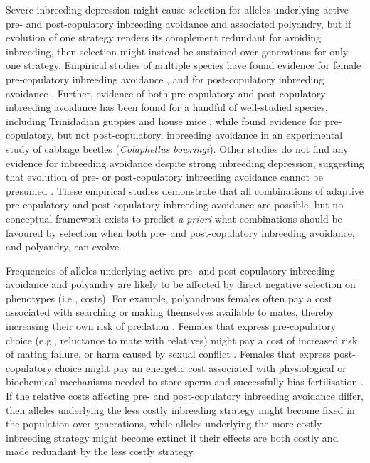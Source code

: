 \documentclass[10pt,letterpaper]{article}
\begin{document}
Severe inbreeding depression might cause selection for alleles underlying active pre- and post-copulatory inbreeding avoidance and associated polyandry, but if evolution of one strategy renders its complement redundant for avoiding inbreeding, then selection might instead be sustained over generations for only one strategy. Empirical studies of multiple species have found evidence for female pre-copulatory inbreeding avoidance \cite[e.g.,][]{Lihoreau2007, Kuriwada2011, Kingma2013, Fischer2015}, and for post-copulatory inbreeding avoidance \cite[e.g.,][]{Simmons2006, Bretman2009}. Further, evidence of both pre-copulatory and post-copulatory inbreeding avoidance has been found for a handful of well-studied species, including Trinidadian guppies \cite[\textit{Poecilia reticulata};][]{Gasparini2011, Daniel2015} and house mice \cite[\textit{Mus domesticus};][]{Potts1991, Firman2015}, while \cite{Liu2014} found evidence for pre-copulatory, but not post-copulatory, inbreeding avoidance in an experimental study of cabbage beetles (\textit{Colaphellus bowringi}). Other studies do not find any evidence for inbreeding avoidance despite strong inbreeding depression, suggesting that evolution of pre- or post-copulatory inbreeding avoidance cannot be presumed \cite[e.g.,][]{Frere2010, Reid2014, Reid2015}. These empirical studies demonstrate that all combinations of adaptive pre-copulatory and post-copulatory inbreeding avoidance are possible, but no conceptual framework exists to predict \textit{a priori} what combinations should be favoured by selection when both pre- and post-copulatory inbreeding avoidance, and polyandry, can evolve. 

Frequencies of alleles underlying active pre- and post-copulatory inbreeding avoidance and polyandry are likely to be affected by direct negative selection on phenotypes (i.e., costs). For example, polyandrous females often pay a cost associated with searching or making themselves available to mates, thereby increasing their own risk of predation \cite[e.g.,][]{Rowe1988, Ronkainen1994, Koga1998}. Females that express pre-copulatory choice (e.g., reluctance to mate with relatives) might pay a cost of increased risk of mating failure, or harm caused by sexual conflict \cite[][]{Rowe1994, Kokko2013}. Females that express post-copulatory choice might pay an energetic cost associated with physiological or biochemical mechanisms needed to store sperm and successfully bias fertilisation \cite[e.g.,][]{Gasparini2011, Tuni2013, Fitzpatrick2014b}. If the relative costs affecting pre- and post-copulatory inbreeding avoidance differ, then alleles underlying the less costly inbreeding strategy might become fixed in the population over generations, while alleles underlying the more costly inbreeding strategy might become extinct if their effects are both costly and made redundant by the less costly strategy.
\end{document}
